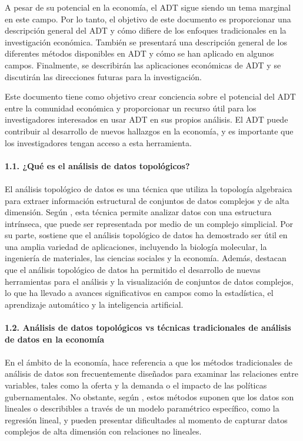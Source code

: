 A pesar de su potencial en la economía, el ADT sigue siendo un tema marginal en este campo. Por lo tanto, el objetivo de este documento es proporcionar una descripción general del ADT y cómo difiere de los enfoques tradicionales en la investigación económica. También se presentará una descripción general de los diferentes métodos disponibles en ADT y cómo se han aplicado en algunos campos. Finalmente, se describirán las aplicaciones económicas de ADT y se discutirán las direcciones futuras para la investigación.

Este documento tiene como objetivo crear conciencia sobre el potencial del ADT entre la comunidad económica y proporcionar un recurso útil para los investigadores interesados en usar ADT en sus propios análisis. El ADT puede contribuir al desarrollo de nuevos hallazgos en la economía, y es importante que los investigadores tengan acceso a esta herramienta.\\\\

\textbf{1.1. ¿Qué es el análisis de datos topológicos?}\\\\
El análisis topológico de datos es una técnica que utiliza la topología algebraica para extraer información estructural de conjuntos de datos complejos y de alta dimensión. Según \cite{books/daglib/0025666}, esta técnica permite analizar datos con una estructura intrínseca, que puede ser representada por medio de un complejo simplicial. Por su parte, \cite{Carlsson2009TopologyAD} sostiene que el análisis topológico de datos ha demostrado ser útil en una amplia variedad de aplicaciones, incluyendo la biología molecular, la ingeniería de materiales, las ciencias sociales y la economía. Además, \cite{carlsson2008zigzag}  destacan que el análisis topológico de datos ha permitido el desarrollo de nuevas herramientas para el análisis y la visualización de conjuntos de datos complejos, lo que ha llevado a avances significativos en campos como la estadística, el aprendizaje automático y la inteligencia artificial.\\\\

\textbf{1.2. Análisis de datos topológicos vs técnicas tradicionales de análisis de datos en la economía}\\\\
En el ámbito de la economía, \cite{10.1257/jep.28.2.3}  hace referencia a que los métodos tradicionales de análisis de datos son frecuentemente diseñados para examinar las relaciones entre variables, tales como la oferta y la demanda o el impacto de las políticas gubernamentales. No obstante, según \cite{hastie2015statistical}, estos métodos suponen que los datos son lineales o describibles a través de un modelo paramétrico específico, como la regresión lineal, y pueden presentar dificultades al momento de capturar datos complejos de alta dimensión con relaciones no lineales.

